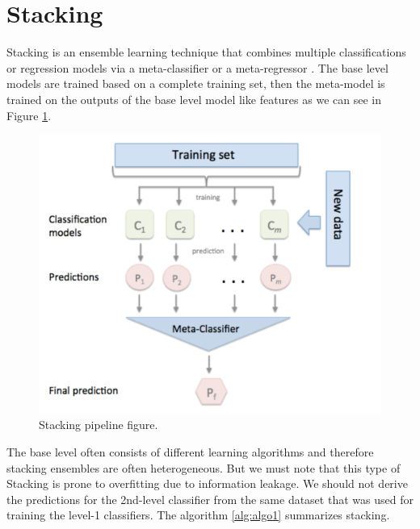 \section{Stacking}
Stacking is an ensemble learning technique that combines multiple classifications or regression models via a meta-classifier or a meta-regressor \cite{stackingref}. The base level models are trained based on a complete training set, then the meta-model is trained on the outputs of the base level model like features as we can see in Figure \ref{fig:stacking}.

\begin{figure}[htbp]
    \centering
    \includegraphics[width=\textwidth]{./Figure/stacking.png}
    \caption{Stacking pipeline figure.}
    \label{fig:stacking}
\end{figure}


The base level often consists of different learning algorithms and therefore stacking ensembles are often heterogeneous. But we must note that this type of Stacking is prone to overfitting due to information leakage. We should not derive the predictions for the 2nd-level classifier from the same dataset that was used for training the level-1 classifiers. The algorithm \ref{alg:algo1} summarizes stacking.

